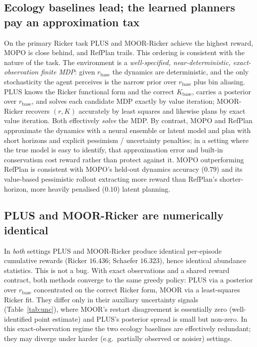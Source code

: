 \documentclass[11pt]{article}
\newcommand{\rbase}{r_{\mathrm{base}}}
\begin{document}
\subsection{Ecology baselines lead; the learned planners pay an approximation tax}
On the primary Ricker task PLUS and MOOR-Ricker achieve the highest reward, MOPO
is close behind, and RefPlan trails. This ordering is consistent with the nature
of the task. The environment is a \emph{well-specified, near-deterministic,
exact-observation finite MDP}: given $\rbase$ the dynamics are deterministic, and
the only stochasticity the agent perceives is the narrow prior over $\rbase$ plus
bin aliasing. PLUS knows the Ricker functional form and the correct
$K_{\mathrm{base}}$, carries a posterior over $\rbase$, and solves each candidate
MDP exactly by value iteration; MOOR-Ricker recovers $(r, K)$ accurately by least
squares and likewise plans by exact value iteration. Both effectively
\emph{solve} the MDP. By contrast, MOPO and RefPlan approximate the dynamics with
a neural ensemble or latent model and plan with short horizons and explicit
pessimism / uncertainty penalties; in a setting where the true model is easy to
identify, that approximation error and built-in conservatism cost reward rather
than protect against it. MOPO outperforming RefPlan is consistent with MOPO's
held-out dynamics accuracy ($0.79$) and its value-based pessimistic rollout
extracting more reward than RefPlan's shorter-horizon, more heavily penalised
($0.10$) latent planning.

\subsection{PLUS and MOOR-Ricker are numerically identical}
In \emph{both} settings PLUS and MOOR-Ricker produce identical per-episode
cumulative rewards (Ricker $16.436$; Schaefer $16.323$), hence identical
abundance statistics. This is not a bug. With exact observations and a shared
reward contract, both methods converge to the same greedy policy: PLUS via a
posterior over $\rbase$ concentrated on the correct Ricker form, MOOR via a
least-squares Ricker fit. They differ only in their auxiliary uncertainty signals
(Table~\ref{tab:unc}), where MOOR's restart disagreement is essentially zero
(well-identified point estimate) and PLUS's posterior spread is small but
non-zero. In this exact-observation regime the two ecology baselines are
effectively redundant; they may diverge under harder (e.g.\ partially observed or
noisier) settings.
\end{document}
